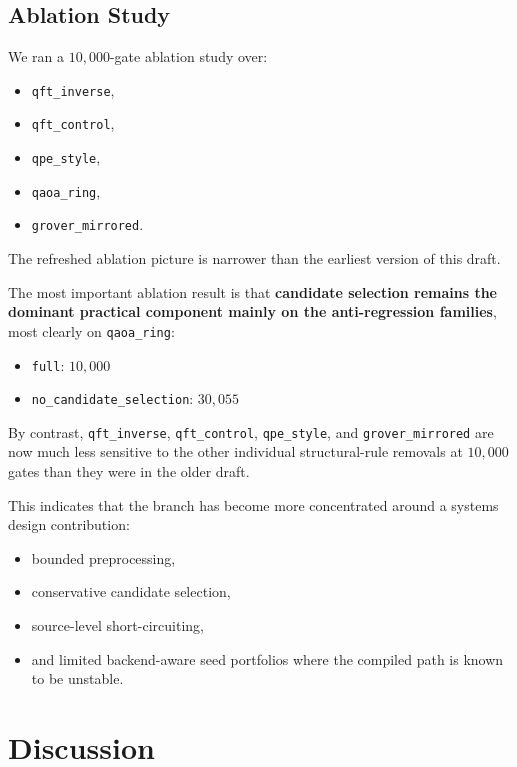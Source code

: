 \documentclass[11pt]{article}
\begin{document}
\subsection{Ablation Study}

We ran a $10{,}000$-gate ablation study over:
\begin{itemize}[leftmargin=1.5em]
    \item \texttt{qft\_inverse},
    \item \texttt{qft\_control},
    \item \texttt{qpe\_style},
    \item \texttt{qaoa\_ring},
    \item \texttt{grover\_mirrored}.
\end{itemize}

The refreshed ablation picture is narrower than the earliest version of this draft.

The most important ablation result is that \textbf{candidate selection remains the dominant practical component mainly on the anti-regression families}, most clearly on \texttt{qaoa\_ring}:
\begin{itemize}[leftmargin=1.5em]
    \item \texttt{full}: $10{,}000$
    \item \texttt{no\_candidate\_selection}: $30{,}055$
\end{itemize}

By contrast, \texttt{qft\_inverse}, \texttt{qft\_control}, \texttt{qpe\_style}, and \texttt{grover\_mirrored} are now much less sensitive to the other individual structural-rule removals at $10{,}000$ gates than they were in the older draft.

This indicates that the branch has become more concentrated around a systems design contribution:
\begin{itemize}[leftmargin=1.5em]
    \item bounded preprocessing,
    \item conservative candidate selection,
    \item source-level short-circuiting,
    \item and limited backend-aware seed portfolios where the compiled path is known to be unstable.
\end{itemize}

\section{Discussion}
\end{document}
